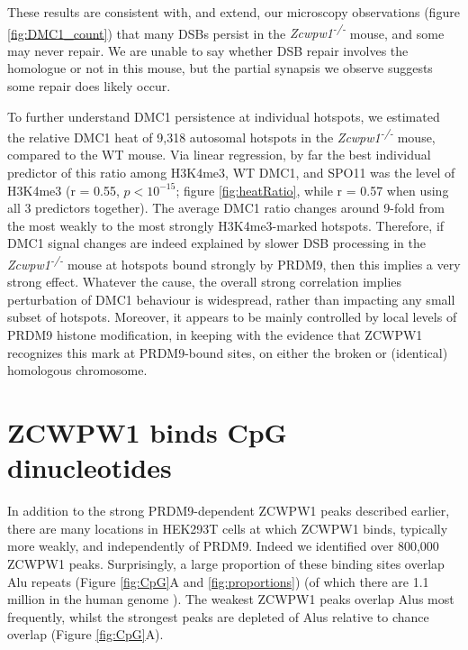 These results are consistent with, and extend, our microscopy observations (figure \ref{fig:DMC1_count}) that many DSBs persist in the \textit{Zcwpw1\textsuperscript{-/-}} mouse, and some may never repair. We are unable to say whether DSB repair involves the homologue or not in this mouse, but the partial synapsis we observe suggests some repair does likely occur.

To further understand DMC1 persistence at individual hotspots, we estimated the relative DMC1 heat of 9,318 autosomal hotspots in the \textit{Zcwpw1\textsuperscript{-/-}} mouse, compared to the WT mouse. Via linear regression, by far the best individual predictor of this ratio among H3K4me3, WT DMC1, and SPO11 was the level of H3K4me3 (r = 0.55, $p < 10^{-15}$; figure \ref{fig:heatRatio}, while r = 0.57 when using all 3 predictors together). The average DMC1 ratio changes around 9-fold from the most weakly to the most strongly H3K4me3-marked hotspots. Therefore, if DMC1 signal changes are indeed explained by slower DSB processing in the \textit{Zcwpw1\textsuperscript{-/-}} mouse at hotspots bound strongly by PRDM9, then this implies a very strong effect. Whatever the cause, the overall strong correlation implies perturbation of DMC1 behaviour is widespread, rather than impacting any small subset of hotspots. Moreover, it appears to be mainly controlled by local levels of PRDM9 histone modification, in keeping with the evidence that ZCWPW1 recognizes this mark at PRDM9-bound sites, on either the broken or (identical) homologous chromosome.

\section{ZCWPW1 binds CpG dinucleotides}
In addition to the strong PRDM9-dependent ZCWPW1 peaks described earlier, there are many locations in HEK293T cells at which ZCWPW1 binds, typically more weakly, and independently of PRDM9. Indeed we identified over 800,000 ZCWPW1 peaks. Surprisingly, a large proportion of these binding sites overlap Alu repeats (Figure \ref{fig:CpG}A and \ref{fig:proportions}) (of which there are 1.1 million in the human genome \parencite{Deininger2011Alu}). The weakest ZCWPW1 peaks overlap Alus most frequently, whilst the strongest peaks are depleted of Alus relative to chance overlap (Figure \ref{fig:CpG}A).

